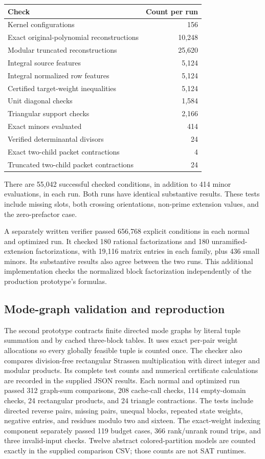 \documentclass[11pt,letterpaper]{article}
\theoremstyle{definition}\newtheorem{definition}[theorem]{Definition}
\theoremstyle{remark}\newtheorem{remark}[theorem]{Remark}
\begin{document}
\begin{center}
\begin{tabular}{@{}lr@{}}\toprule
Check & Count per run\\\midrule
Kernel configurations & 156\\
Exact original-polynomial reconstructions & 10,248\\
Modular truncated reconstructions & 25,620\\
Integral source features & 5,124\\
Integral normalized row features & 5,124\\
Certified target-weight inequalities & 5,124\\
Unit diagonal checks & 1,584\\
Triangular support checks & 2,166\\
Exact minors evaluated & 414\\
Verified determinantal divisors & 24\\
Exact two-child packet contractions & 4\\
Truncated two-child packet contractions & 24\\
\bottomrule\end{tabular}
\end{center}
There are 55,042 successful checked conditions, in addition to 414 minor
evaluations, in each run. Both runs have identical substantive results.
These tests include missing slots, both crossing orientations, non-prime
extension values, and the zero-prefactor case.

A separately written verifier passed 656,768 explicit conditions in each
normal and optimized run. It checked 180 rational factorizations and 180
unramified-extension factorizations, with 19,116 matrix entries in each
family, plus 436 small minors. Its substantive results also agree between
the two runs. This additional implementation checks the normalized block
factorization independently of the production prototype's formulas.

\subsection{Mode-graph validation and reproduction}

The second prototype contracts finite directed mode graphs by literal tuple
summation and by cached three-block tables. It uses exact per-pair weight
allocations so every globally feasible tuple is counted once. The checker
also compares division-free rectangular Strassen multiplication with direct
integer and modular products. Its complete test counts and numerical
certificate calculations are recorded in the supplied JSON results. Each
normal and optimized run passed 312 graph-sum comparisons, 208 cache-call
checks, 114 empty-domain checks, 24 rectangular products, and 24 triangle
contractions. The tests include directed reverse pairs, missing pairs,
unequal blocks, repeated state weights, negative entries, and residues
modulo two and sixteen.
The exact-weight indexing component separately passed 119 budget cases,
366 rank/unrank round trips, and three invalid-input checks. Twelve abstract
colored-partition models are counted exactly in the supplied comparison CSV;
those counts are not SAT runtimes.
\end{document}
